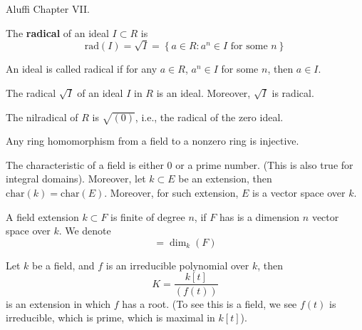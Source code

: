 \documentclass[openany]{book}
\newcommand{\rad}{\text{rad}}
\begin{document}
Aluffi Chapter VII. 


\begin{defn}[radical]
    The \textbf{radical} of an ideal $I\subset R$ is 
    \begin{equation*}
        \rad(I)=\sqrt{I}=\left\{a\in R: a^n\in I \text{ for some $n$}\right\}
    \end{equation*}

    An ideal is called radical if for any $a\in R$, $a^n\in I$ for some $n$, then $a\in I$.
\end{defn}


\begin{prop}
    The radical $\sqrt{I}$ of an ideal $I$ in $R$ is an ideal. Moreover, $\sqrt{I}$ is radical.
\end{prop}

\begin{example}
    The nilradical of $R$ is $\sqrt{(0)}$, i.e., the radical of the zero ideal.
\end{example}








\begin{prop}
    Any ring homomorphism from a field to a nonzero ring is injective.
\end{prop}


\begin{prop}
    The characteristic of a field is either $0$ or a prime number. (This is also true for integral domains). Moreover, let $k\subset E$ be an extension, then $\text{char}(k)=\text{char}(E)$. Moreover, for such extension, $E$ is a vector space over $k$. 
\end{prop}







\begin{defn}
    A field extension $k\subset F$ is finite of degree $n$, if $F$ has is a dimension $n$ vector space over $k$. We denote 
    \begin{equation*}
        [F:k]=\dim_k(F)
    \end{equation*}
\end{defn}

\begin{example}
    Let $k$ be a field, and $f$ is an irreducible polynomial over $k$, then 
    \begin{equation*}
        K=\frac{k[t]}{(f(t))}
    \end{equation*}
    is an extension in which $f$ has a root. (To see this is a field, we see $f(t)$ is irreducible, which is prime, which is maximal in $k[t]$).
\end{example}
\end{document}
